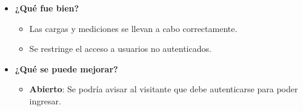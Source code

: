 	\begin{itemize}
		\item \textbf{¿Qué fue bien?}
        	\begin{itemize}
				\item Las cargas y mediciones se llevan a cabo correctamente.
				\item Se restringe el acceso a usuarios no autenticados.
			\end{itemize}
   		\item \textbf{¿Qué se puede mejorar?}
        	\begin{itemize}
		        \item \textbf{Abierto}: Se podría avisar al visitante que debe autenticarse para poder ingresar.
            \end{itemize}
        

	\end{itemize}